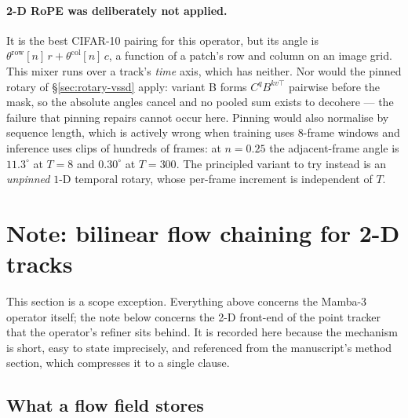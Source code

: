 \documentclass[11pt,a4paper]{article}
\begin{document}
\paragraph{2-D RoPE was deliberately not applied.} It is the best CIFAR-10 pairing for this
operator, but its angle is $\theta^{\mathrm{row}}[n]\,r + \theta^{\mathrm{col}}[n]\,c$, a function
of a patch's row and column on an image grid. This mixer runs over a track's \emph{time} axis,
which has neither. Nor would the pinned rotary of \S\ref{sec:rotary-vssd} apply: variant B
forms $C^q B^{kv\top}$ pairwise before the mask, so the absolute angles cancel and no pooled sum
exists to decohere --- the failure that pinning repairs cannot occur here. Pinning would also
normalise by sequence length, which is actively wrong when training uses $8$-frame windows and
inference uses clips of hundreds of frames: at $n=0.25$ the adjacent-frame angle is $11.3^\circ$
at $T{=}8$ and $0.30^\circ$ at $T{=}300$. The principled variant to try instead is an
\emph{unpinned} $1$-D temporal rotary, whose per-frame increment is independent of $T$.

\section{Note: bilinear flow chaining for 2-D tracks}\label{sec:flow-chaining}

This section is a scope exception. Everything above concerns the Mamba-3 operator
itself; the note below concerns the 2-D front-end of the point tracker that the
operator's refiner sits behind. It is recorded here because the mechanism is
short, easy to state imprecisely, and referenced from the manuscript's method
section, which compresses it to a single clause.

\subsection{What a flow field stores}
\end{document}
